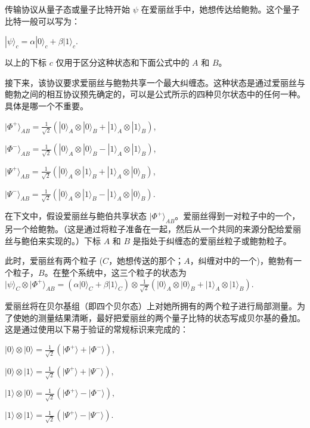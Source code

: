 传输协议从量子态或量子比特开始 $\psi$ 在爱丽丝手中，她想传达给鲍勃。这个量子比特一般可以写为：

$|\psi\rangle_c = \alpha|0\rangle_c + \beta|1\rangle_c$.

以上的下标 $c$ 仅用于区分这种状态和下面公式中的 $A$ 和 $B$。

接下来，该协议要求爱丽丝与鲍勃共享一个最大纠缠态。这种状态是通过爱丽丝与鲍勃之间的相互协议预先确定的，可以是公式所示的四种贝尔状态中的任何一种。具体是哪一个不重要。

$|\Phi^+\rangle_{AB} = \frac{1}{\sqrt{2}} (|0\rangle_A \otimes |0\rangle_B + |1\rangle_A \otimes |1\rangle_B)$,

$|\Phi^-\rangle_{AB} = \frac{1}{\sqrt{2}} (|0\rangle_A \otimes |0\rangle_B - |1\rangle_A \otimes |1\rangle_B)$,

$|\Psi^+\rangle_{AB} = \frac{1}{\sqrt{2}} (|0\rangle_A \otimes |1\rangle_B + |1\rangle_A \otimes |0\rangle_B)$,

$|\Psi^-\rangle_{AB} = \frac{1}{\sqrt{2}} (|0\rangle_A \otimes |1\rangle_B - |1\rangle_A \otimes |0\rangle_B)$.

在下文中，假设爱丽丝与鲍伯共享状态 $\lvert \Phi^{+} \rangle_{AB}$。爱丽丝得到一对粒子中的一个，另一个给鲍勃。（这是通过将粒子准备在一起，然后从一个共同的来源分配给爱丽丝与鲍伯来实现的。）下标 $A$ 和 $B$ 是指处于纠缠态的爱丽丝粒子或鲍勃粒子。

此时，爱丽丝有两个粒子 ($C$，她想传送的那个；$A$，纠缠对中的一个)，鲍勃有一个粒子，$B$。在整个系统中，这三个粒子的状态为
$\lvert \psi \rangle_{C} \otimes \lvert \Phi^{+} \rangle_{AB} = (\alpha \lvert 0 \rangle_{C} + \beta \lvert 1 \rangle_{C}) \otimes \frac{1}{\sqrt{2}} (\lvert 0 \rangle_{A} \otimes \lvert 0 \rangle_{B} + \lvert 1 \rangle_{A} \otimes \lvert 1 \rangle_{B}).$

爱丽丝将在贝尔基组（即四个贝尔态）上对她所拥有的两个粒子进行局部测量。为了使她的测量结果清晰，最好把爱丽丝的两个量子比特的状态写成贝尔基的叠加。这是通过使用以下易于验证的常规标识来完成的：

$\lvert 0 \rangle \otimes \lvert 0 \rangle = \frac{1}{\sqrt{2}} (\lvert \Phi^{+} \rangle + \lvert \Phi^{-} \rangle),$

$\lvert 0 \rangle \otimes \lvert 1 \rangle = \frac{1}{\sqrt{2}} (\lvert \Psi^{+} \rangle + \lvert \Psi^{-} \rangle),$

$\lvert 1 \rangle \otimes \lvert 0 \rangle = \frac{1}{\sqrt{2}} (\lvert \Phi^{+} \rangle - \lvert \Phi^{-} \rangle),$

$\lvert 1 \rangle \otimes \lvert 1 \rangle = \frac{1}{\sqrt{2}} (\lvert \Psi^{+} \rangle - \lvert \Psi^{-} \rangle).$

